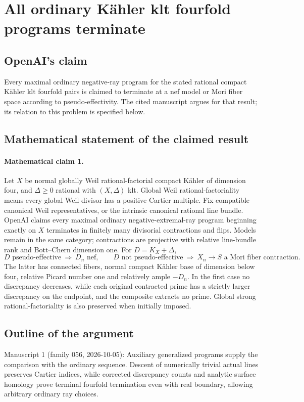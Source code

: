 \documentclass[11pt]{article}
\begin{document}
\section*{All ordinary Kähler klt fourfold programs terminate}

\subsection{OpenAI's claim}
Every maximal ordinary negative-ray program for the stated rational compact Kähler klt fourfold pairs is claimed to terminate at a nef model or Mori fiber space according to pseudo-effectivity. The cited manuscript argues for that result; its relation to this problem is specified below.

\subsection{Mathematical statement of the claimed result}
\paragraph{Mathematical claim 1.} Let $X$ be normal globally Weil rational-factorial compact Kähler of dimension four, and $\Delta\ge0$ rational with $(X,\Delta)$ klt. Global Weil rational-factoriality means every global Weil divisor has a positive Cartier multiple. Fix compatible canonical Weil representatives, or the intrinsic canonical rational line bundle. OpenAI claims every maximal ordinary negative-extremal-ray program beginning exactly on $X$ terminates in finitely many divisorial contractions and flips. Models remain in the same category; contractions are projective with relative line-bundle rank and Bott--Chern dimension one. For $D=K_X+\Delta$,
\[
D\text{ pseudo-effective}\ \Longrightarrow\ D_n\text{ nef},\qquad
D\text{ not pseudo-effective}\ \Longrightarrow\ X_n\to S\text{ a Mori fiber contraction}.
\]
The latter has connected fibers, normal compact Kähler base of dimension below four, relative Picard number one and relatively ample $-D_n$. In the first case no discrepancy decreases, while each original contracted prime has a strictly larger discrepancy on the endpoint, and the composite extracts no prime. Global strong rational-factoriality is also preserved when initially imposed.

\subsection{Outline of the argument}
Manuscript 1 (family 056, 2026-10-05): Auxiliary generalized programs supply the comparison with the ordinary sequence. Descent of numerically trivial actual lines preserves Cartier indices, while corrected discrepancy counts and analytic surface homology prove terminal fourfold termination even with real boundary, allowing arbitrary ordinary ray choices.
\end{document}
